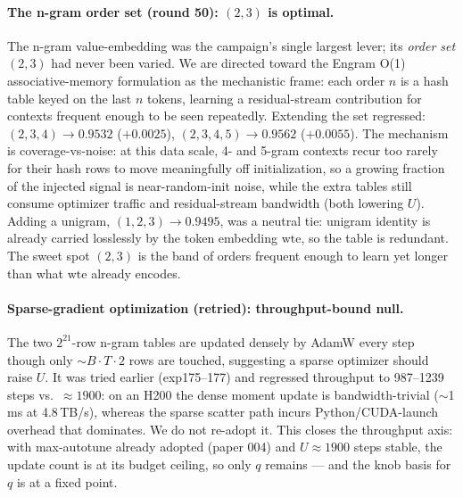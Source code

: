 \documentclass{article}
\begin{document}
\paragraph{The n-gram order set (round 50): $(2,3)$ is optimal.} The n-gram value-embedding was the campaign's single largest lever; its \emph{order set} $(2,3)$ had never been varied. We are directed toward the Engram O(1) associative-memory formulation \cite{engram2026} as the mechanistic frame: each order $n$ is a hash table keyed on the last $n$ tokens, learning a residual-stream contribution for contexts frequent enough to be seen repeatedly. Extending the set regressed: $(2,3,4) \rightarrow 0.9532$ ($+0.0025$), $(2,3,4,5) \rightarrow 0.9562$ ($+0.0055$). The mechanism is coverage-vs-noise: at this data scale, 4- and 5-gram contexts recur too rarely for their hash rows to move meaningfully off initialization, so a growing fraction of the injected signal is near-random-init noise, while the extra tables still consume optimizer traffic and residual-stream bandwidth (both lowering $U$). Adding a unigram, $(1,2,3) \rightarrow 0.9495$, was a neutral tie: unigram identity is already carried losslessly by the token embedding $\mathrm{wte}$, so the table is redundant. The sweet spot $(2,3)$ is the band of orders frequent enough to learn yet longer than what $\mathrm{wte}$ already encodes.

\paragraph{Sparse-gradient optimization (retried): throughput-bound null.} The two $2^{21}$-row n-gram tables are updated densely by AdamW every step though only $\sim$$B\cdot T\cdot 2$ rows are touched, suggesting a sparse optimizer should raise $U$. It was tried earlier (exp175--177) and regressed throughput to 987--1239 steps vs.\ $\approx 1900$: on an H200 the dense moment update is bandwidth-trivial ($\sim$1\,ms at 4.8\,TB/s), whereas the sparse scatter path incurs Python/CUDA-launch overhead that dominates. We do not re-adopt it. This closes the throughput axis: with max-autotune already adopted (paper 004) and $U \approx 1900$ steps stable, the update count is at its budget ceiling, so only $q$ remains --- and the knob basis for $q$ is at a fixed point.
\end{document}
